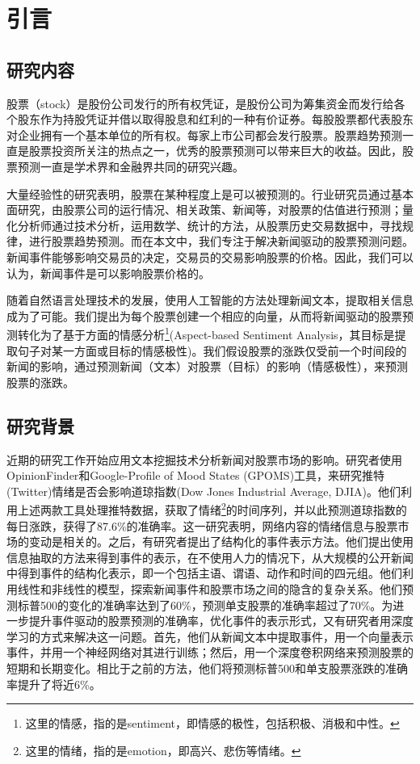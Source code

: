 \chapter{引言}
\label{cha:introduction}

\section{研究内容}

股票（stock）是股份公司发行的所有权凭证，是股份公司为筹集资金而发行给各个股东作为持股凭证并借以取得股息和红利的一种有价证券。每股股票都代表股东对企业拥有一个基本单位的所有权。每家上市公司都会发行股票。股票趋势预测一直是股票投资所关注的热点之一，优秀的股票预测可以带来巨大的收益。因此，股票预测一直是学术界和金融界共同的研究兴趣。

大量经验性的研究表明，股票在某种程度上是可以被预测的。行业研究员通过基本面研究，由股票公司的运行情况、相关政策、新闻等，对股票的估值进行预测；量化分析师通过技术分析，运用数学、统计的方法，从股票历史交易数据中，寻找规律，进行股票趋势预测。而在本文中，我们专注于解决新闻驱动的股票预测问题。新闻事件能够影响交易员的决定，交易员的交易影响股票的价格。因此，我们可以认为，新闻事件是可以影响股票价格的。

随着自然语言处理技术的发展，使用人工智能的方法处理新闻文本，提取相关信息成为了可能。我们提出为每个股票创建一个相应的向量，从而将新闻驱动的股票预测转化为了基于方面的情感分析\footnote{这里的情感，指的是sentiment，即情感的极性，包括积极、消极和中性。}(Aspect-based Sentiment Analysis，其目标是提取句子对某一方面或目标的情感极性)。我们假设股票的涨跌仅受前一个时间段的新闻的影响，通过预测新闻（文本）对股票（目标）的影响（情感极性），来预测股票的涨跌。
\section{研究背景}

近期的研究工作开始应用文本挖掘技术分析新闻对股票市场的影响。研究者使用OpinionFinder\cite{Wilson2005OpinionFinder}和Google-Profile of Mood States (GPOMS)工具，来研究推特(Twitter)情绪是否会影响道琼指数(Dow Jones Industrial Average, DJIA)\cite{bollen2011twitter}。他们利用上述两款工具处理推特数据，获取了情绪\footnote{这里的情绪，指的是emotion，即高兴、悲伤等情绪。}的时间序列，并以此预测道琼指数的每日涨跌，获得了87.6\%的准确率。这一研究表明，网络内容的情绪信息与股票市场的变动是相关的。之后，有研究者提出了结构化的事件表示方法\cite{ding2014using}。他们提出使用信息抽取的方法来得到事件的表示，在不使用人力的情况下，从大规模的公开新闻中得到事件的结构化表示，即一个包括主语、谓语、动作和时间的四元组。他们利用线性和非线性的模型，探索新闻事件和股票市场之间的隐含的复杂关系。他们预测标普500的变化的准确率达到了60\%，预测单支股票的准确率超过了70\%。为进一步提升事件驱动的股票预测的准确率，优化事件的表示形式，又有研究者用深度学习的方式来解决这一问题\cite{ding2015deep}。首先，他们从新闻文本中提取事件，用一个向量表示事件，并用一个神经网络对其进行训练；然后，用一个深度卷积网络来预测股票的短期和长期变化。相比于之前的方法，他们将预测标普500和单支股票涨跌的准确率提升了将近6\%。

